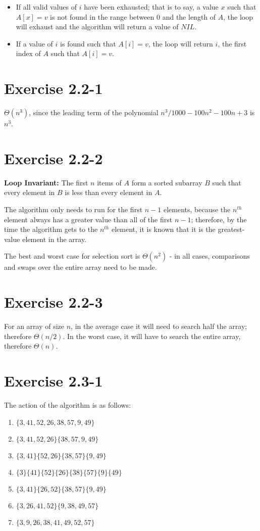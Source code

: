 \documentclass[11pt]{article}
\begin{document}
\begin{itemize}
	\item If all valid values of $i$ have been exhausted; that is to say, a value $x$ such that $A[x] = v$ is not found in the range between $0$ and the length of $A$, the loop will exhaust and the algorithm will return a value of $NIL$.
	\item If a value of $i$ is found such that $A[i] = v$, the loop will return $i$, the first index of $A$ such that $A[i] = v$.
\end{itemize}

\section*{Exercise 2.2-1}
$\Theta(n^3)$, since the leading term of the polynomial $n^3/1000 - 100n^2 - 100n + 3$ is $n^3$.

\section*{Exercise 2.2-2}


\textbf{Loop Invariant:} The first $n$ items of $A$ form a sorted subarray $B$ such that every element in $B$ is less than every element in $A$.

The algorithm only needs to run for the first $n-1$ elements, because the $n^{th}$ element always has a greater value than all of the first $n-1$; therefore, by the time the algorithm gets to the $n^{th}$ element, it is known that it is the greatest-value element in the array.

The best and worst case for selection sort is $\Theta(n^2)$ - in all cases, comparisons and swaps over the entire array need to be made.

\section*{Exercise 2.2-3}
For an array of size $n$, in the average case it will need to search half the array; therefore $\Theta(n/2)$. In the worst case, it will have to search the entire array, therefore $\Theta(n)$.

\section*{Exercise 2.3-1}
The action of the algorithm is as follows:
\begin{enumerate}
	\item { $ \{3,41,52,26,38,57,9,49\} $ }
	\item { $ \{3,41,52,26\} \{38,57,9,49\} $ }
	\item { $ \{3,41\} \{52,26\} \{38,57\} \{9,49\} $ }
	\item { $ \{3\} \{41\} \{52\} \{26\} \{38\} \{57\} \{9\} \{49\} $ }
	\item { $ \{3,41\} \{26,52\} \{38,57\} \{9,49\} $ }
	\item { $ \{3,26,41,52\} \{9,38,49,57\} $ }
	\item { $ \{3,9,26,38,41,49,52,57\} $ }
\end{enumerate}
\end{document}
